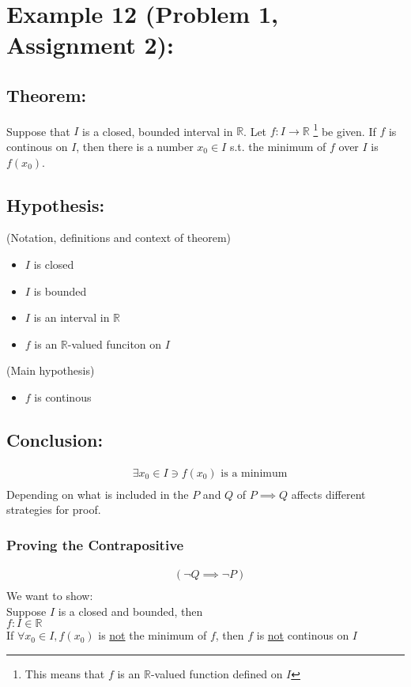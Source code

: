 \documentclass{article}
\begin{document}
\section{Example 12 (Problem 1, Assignment 2):}
\subsection{Theorem:} Suppose that $I$ is a closed, bounded interval in $\mathbb{R}$. Let $f: I \rightarrow \mathbb{R}$ \footnote{This means that $f$ is an $\mathbb{R}$-valued function defined on $I$} be given. If $f$ is continous on $I$, then there is a number $x_0 \in I$ s.t. the minimum of $f$ over $I$ is $f(x_0)$.
\subsection{Hypothesis:}
(Notation, definitions and context of theorem)
\begin{itemize}
\item $I$ is closed
\item $I$ is bounded
\item $I$ is an interval in $\mathbb{R}$
\item $f$ is an $\mathbb{R}$-valued funciton on $I$
\end{itemize}
(Main hypothesis)
\begin{itemize}
\item $f$ is continous
\end{itemize}

\subsection{Conclusion:}
\begin{align*}
 	& \exists x_0 \in I \ni f(x_0) \text{ is a minimum} \\
\end{align*}
Depending on what is included in the $P$ and $Q$ of $P \implies Q$ affects different strategies for proof.
\subsubsection{Proving the Contrapositive}
\begin{align*}
 	& (\neg Q \implies \neg P) \\
\end{align*}
We want to show:\\
Suppose $I$ is a closed and bounded, then\\
$f: I \in \mathbb{R}$\\
If $\forall x_0 \in I, f(x_0)$ is \underline{not} the minimum of $f$, then $f$ is \underline{not} continous on $I$
\end{document}
